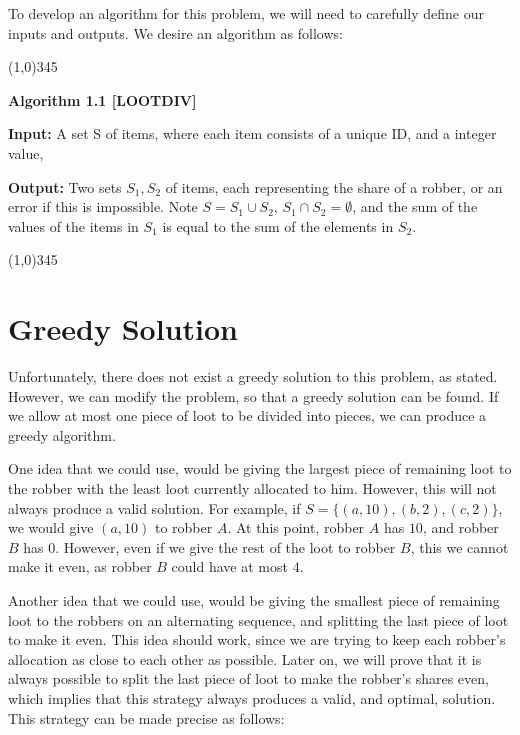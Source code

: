 \documentclass{article}
\begin{document}
To develop an algorithm for this problem, we will need to carefully define our inputs and outputs.  We desire an algorithm as follows:

\begin{center}
\line(1,0){345}
\end{center}
\textbf{Algorithm 1.1 [LOOTDIV]}

\textbf{Input:} A set S of items, where each item consists of a unique ID, and a integer value,

\textbf{Output:} Two sets $S_1, S_2$ of items, each representing the share of a robber, or an error if this is impossible.  Note $S = S_1 \cup S_2$, $S_1 \cap S_2 = \emptyset$, and the sum of the values of the items in $S_1$ is equal to the sum of the elements in $S_2$. 

\begin{center}
\line(1,0){345}
\end{center}

\newpage

\section{Greedy Solution}

Unfortunately, there does not exist a greedy solution to this problem, as stated.  However, we can modify the problem, so that a greedy solution can be found.  If we allow at most one piece of loot to be divided into pieces, we can produce a greedy algorithm.

One idea that we could use, would be giving the largest piece of remaining loot to the robber with the least loot currently allocated to him.  However, this will not always produce a valid solution.  For example, if $S = \{(a,10),(b,2),(c,2)\}$, we would give $(a,10)$ to robber $A$.  At this point, robber $A$ has $10$, and robber $B$ has $0$.  However, even if we give the rest of the loot to robber $B$, this we cannot make it even, as robber $B$ could have at most $4$.

Another idea that we could use, would be giving the smallest piece of remaining loot to the robbers on an alternating sequence, and splitting the last piece of loot to make it even.  This idea should work, since we are trying to keep each robber's allocation as close to each other as possible.  Later on, we will prove that it is always possible to split the last piece of loot to make the robber's shares even, which implies that this strategy always produces a valid, and optimal, solution.  This strategy can be made precise as follows:
\end{document}
